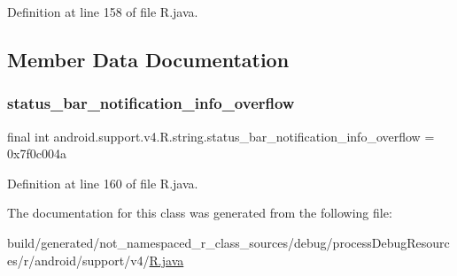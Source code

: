 Definition at line 158 of file R.\+java.


\begin{DoxyCode}{0}

\end{DoxyCode}


\subsection{Member Data Documentation}
\mbox{\label{classandroid_1_1support_1_1v4_1_1_r_1_1string_ad88576c15d5591bc789ca0c9f54796d2}} 
\subsubsection{\texorpdfstring{status\_bar\_notification\_info\_overflow}{status\_bar\_notification\_info\_overflow}}
{\footnotesize\ttfamily final int android.\+support.\+v4.\+R.\+string.\+status\+\_\+bar\+\_\+notification\+\_\+info\+\_\+overflow = 0x7f0c004a\hspace{0.3cm}{\ttfamily [static]}}



Definition at line 160 of file R.\+java.



The documentation for this class was generated from the following file\+:\begin{DoxyCompactItemize}
\item 
build/generated/not\+\_\+namespaced\+\_\+r\+\_\+class\+\_\+sources/debug/process\+Debug\+Resources/r/android/support/v4/\mbox{\hyperlink{android_2support_2v4_2_r_8java}{R.\+java}}\end{DoxyCompactItemize}
